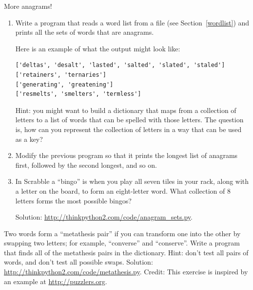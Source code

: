 \documentclass[10pt]{book}
\begin{document}
\begin{exercise}
\label{anagrams}

More anagrams!

\begin{enumerate}

\item Write a program
that reads a word list from a file (see Section~\ref{wordlist}) and
prints all the sets of words that are anagrams.

Here is an example of what the output might look like:

\begin{verbatim}
['deltas', 'desalt', 'lasted', 'salted', 'slated', 'staled']
['retainers', 'ternaries']
['generating', 'greatening']
['resmelts', 'smelters', 'termless']
\end{verbatim}
%
Hint: you might want to build a dictionary that maps from a
collection of letters to a list of words that can be spelled with those
letters.  The question is, how can you represent the collection of
letters in a way that can be used as a key?

\item Modify the previous program so that it prints the longest list
of anagrams first, followed by the second longest, and so on.

\item In Scrabble a ``bingo'' is when you play all seven tiles in
your rack, along with a letter on the board, to form an eight-letter
word.  What collection of 8 letters forms the most possible bingos?


Solution: \url{http://thinkpython2.com/code/anagram_sets.py}.

\end{enumerate}
\end{exercise}

\begin{exercise}

Two words form a ``metathesis pair'' if you can transform one into the
other by swapping two letters; for example, ``converse'' and
``conserve''.  Write a program that finds all of the metathesis pairs
in the dictionary.  Hint: don't test all pairs of words, and don't
test all possible swaps.  Solution:
\url{http://thinkpython2.com/code/metathesis.py}.  Credit: This
exercise is inspired by an example at \url{http://puzzlers.org}.

\end{exercise}
\end{document}
